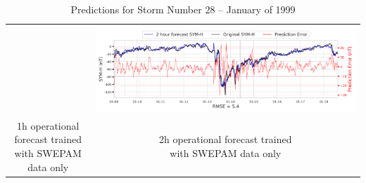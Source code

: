 \documentclass[draft,sw]{agutexSI2019}
\begin{document}
\begin{table}
\begin{tabular}{cc}
&
\includegraphics[width=0.49\linewidth]{paper_plots_shade/2h_swepam_rt/2h_swepam_rt_storm_28.png}
\\
\shortstack{1h operational forecast trained\\ with SWEPAM data only} & \shortstack{2h operational forecast trained\\ with SWEPAM data only}
\vspace*{12pt}
\\
\end{tabular}
\caption{Predictions for Storm Number 28 -- January of 1999}
\label{storm-28}
\end{table}
\end{document}
